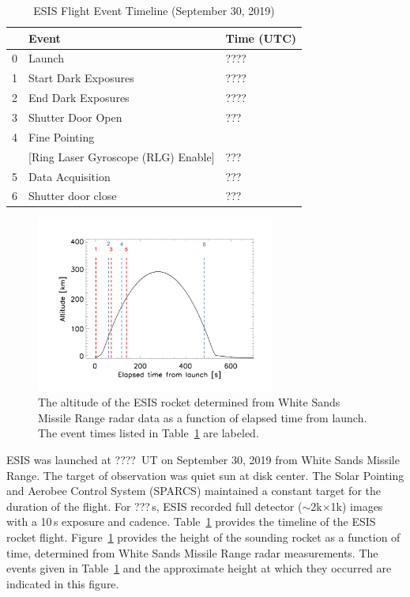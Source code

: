 		\begin{center}
			\begin{table}[ht]
				\caption{ESIS Flight Event Timeline (September 30, 2019)}
				\label{tab:timeline}
				\begin{tabular}{lll}\hline
					{\bf} & {\bf Event} & {\bf Time (UTC)}\\ \hline
					0 & Launch        &    ???? \\
					1 & Start Dark Exposures  &  ????\\
					2 & End Dark  Exposures  &  ????\\
					3 & Shutter Door Open     &   ??? \\
					4 & Fine Pointing    &    \\
					& [Ring Laser Gyroscope (RLG) Enable] & ???\\
					5 & Data Acquisition     &     ???\\
					6 & Shutter door close    &   ??? \\ \hline
				\end{tabular}
			\end{table}
		\end{center}
	
		\begin{figure}[h!]
			\begin{center}
				\includegraphics[width=0.7\textwidth]{figures/altevents.png}
				\caption{The altitude of the ESIS rocket determined from White Sands Missile Range radar data as a function of elapsed time from launch.  The event times listed in Table~\ref{tab:timeline} are labeled.}
				\label{fig:timeline}
			\end{center}
		\end{figure}

		ESIS was launched at ????~UT on September 30, 2019 from White Sands Missile Range.  The target of observation was quiet sun at disk center.  The Solar Pointing and Aerobee Control System (SPARCS) maintained a constant target for the duration of the flight.  For ???\,s, ESIS recorded full detector ($\sim$2k$\times$1k) images with a 10\,s exposure and cadence. %
		Table~\ref{tab:timeline} provides the timeline of the ESIS rocket flight. Figure~\ref{fig:timeline} provides the height of the sounding rocket as a function of time, determined from White Sands Missile Range radar measurements.  The events given in Table~\ref{tab:timeline} and the approximate height at which they occurred are indicated in this figure.


